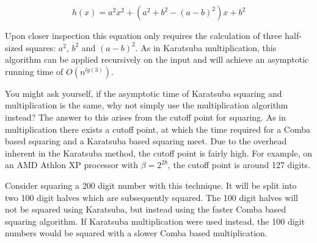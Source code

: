 \documentclass[b5paper]{book}
\begin{document}
\begin{equation}
h(x) = a^2x^2 + \left (a^2 + b^2 - (a - b)^2 \right )x + b^2
\end{equation}

Upon closer inspection this equation only requires the calculation of three half-sized squares: $a^2$, $b^2$ and $(a - b)^2$.  As in 
Karatsuba multiplication, this algorithm can be applied recursively on the input and will achieve an asymptotic running time of 
$O \left ( n^{lg(3)} \right )$.

You might ask yourself, if the asymptotic time of Karatsuba squaring and multiplication is the same, why not simply use the multiplication algorithm 
instead?  The answer to this arises from the cutoff point for squaring.  As in multiplication there exists a cutoff point, at which the 
time required for a Comba based squaring and a Karatsuba based squaring meet.  Due to the overhead inherent in the Karatsuba method, the cutoff 
point is fairly high.  For example, on an AMD Athlon XP processor with $\beta = 2^{28}$, the cutoff point is around 127 digits.  

Consider squaring a 200 digit number with this technique.  It will be split into two 100 digit halves which are subsequently squared.  
The 100 digit halves will not be squared using Karatsuba, but instead using the faster Comba based squaring algorithm.  If Karatsuba multiplication
were used instead, the 100 digit numbers would be squared with a slower Comba based multiplication.  
\end{document}
